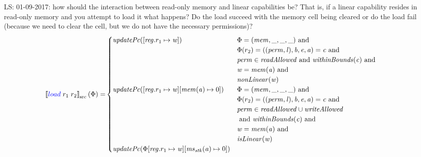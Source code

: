 \documentclass[a4paper]{article}
\newcommand\lau[1]{{\color{purple} \sf \footnotesize {LS: #1}}\\}
\newcommand{\sem}[1]{\left\llbracket #1 \right\rrbracket}
\newcommand{\ssem}[2][\Phi]{\sem{#2}_{\mathrm{src}}(#1)}
\newcommand{\tand}{\text{ and }}
\newcommand{\sourcecolor}[1]{\color{blue}}
\newcommand{\src}[1]{{\sourcecolor{} #1}}
\newcommand{\zinstr}[1]{#1}
\newcommand{\twoinstr}[3]{
  \ifthenelse{\equal{#2#3}{}}
  {\zinstr{#1}}
  {\zinstr{#1} \; #2 \; #3}
}
\newcommand{\sload}[2]{\twoinstr{\src{load}}{#1}{#2}}
\newcommand{\update}[2]{[#1 \mapsto #2]}
\newcommand{\perm}{\var{perm}}
\newcommand{\lin}{\var{l}}
\newcommand{\var}[1]{\mathit{#1}}
\newcommand{\reg}{\var{reg}}
\newcommand{\mem}{\var{mem}}
\newcommand{\ms}{\var{ms}}
\newcommand{\stk}{\var{stk}}
\newcommand{\baddr}{\var{b}}
\newcommand{\eaddr}{\var{e}}
\newcommand{\aaddr}{\var{a}}
\newcommand{\plainfun}[2]{
  \ifthenelse{\equal{#2}{}}
  {\mathit{#1}}
  {\mathit{#1}(#2)}
}
\newcommand{\updPcAddr}[1]{\plainfun{updatePc}{#1}}
\newcommand{\readAllowed}[1]{\plainfun{readAllowed}{#1}}
\newcommand{\writeAllowed}[1]{\plainfun{writeAllowed}{#1}}
\newcommand{\nonLinear}[1]{\plainfun{nonLinear}{#1}}
\newcommand{\isLinear}[1]{\plainfun{isLinear}{#1}}
\newcommand{\withinBounds}[1]{\plainfun{withinBounds}{#1}}
\begin{document}
\lau{01-09-2017: how should the interaction between read-only memory and linear capabilities be? That is, if a linear capability resides in read-only memory and you attempt to load it what happens? Do the load succeed with the memory cell being cleared or do the load fail (because we need to clear the cell, but we do not have the necessary permissions)? }
\begin{align*}
  \ssem{\sload{r_1}{r_2}} = & 
                              \begin{cases}
                                \updPcAddr{\update{\reg.r_1}{\var{w}}} &
                                \arraycolsep=0pt
                                \begin{array}[t]{l}
                                  \Phi = (\mem, \_, \_, \_) \tand \\
                                  \Phi(r_2) = ((\perm,\lin),\baddr,\eaddr,\aaddr) = \var{c} \tand\\
                                  \perm \in \readAllowed{} \tand \withinBounds{\var{c}} \tand \\
                                  \var{w} = \mem(\aaddr) \tand \\
                                  \nonLinear{\var{w}}
                                \end{array}\\
                                \updPcAddr{\update{\reg.r_1}{\var{w}}\update{\mem(\aaddr)}{0}} &
                                \arraycolsep=0pt
                                \begin{array}[t]{l}
                                  \Phi = (\mem, \_, \_, \_) \tand \\
                                  \Phi(r_2) = ((\perm,\lin),\baddr,\eaddr,\aaddr) = \var{c} \tand\\
                                  \perm \in \readAllowed{} \cup \writeAllowed{} \\
                                  \tand \withinBounds{\var{c}} \tand \\
                                  \var{w} = \mem(\aaddr) \tand \\
                                  \isLinear{\var{w}}
                                \end{array}\\
                                \updPcAddr{\Phi\update{\reg.r_1}{\var{w}}\update{\ms_\stk(\aaddr)}{0}} & 
                                \arraycolsep=0pt

\end{cases}
\end{align*}
\end{document}
